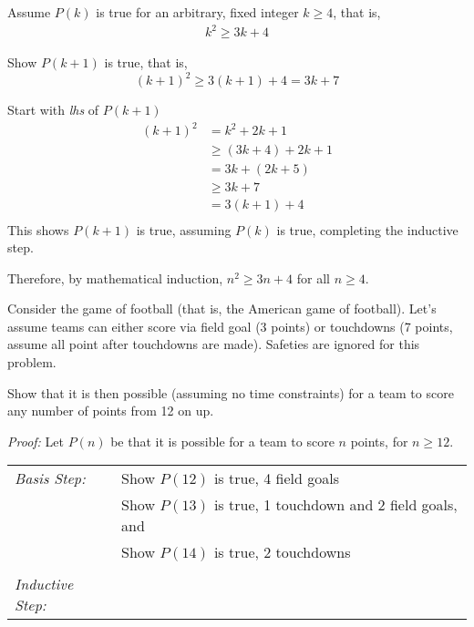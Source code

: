 \begin{questions}
\begin{solution}
  Assume $P(k)$ is true for an arbitrary, fixed integer $k \geq 4$, that is, 
  \begin{align*}
    k^2 \geq 3k + 4 \tag{IH} 
  \end{align*}

  Show $P(k+1)$ is true, that is, 
  \[ (k+1)^2 \geq 3(k+1) + 4 = 3k + 7 \]

  Start with \textit{lhs} of $P(k+1)$
  \begin{align*}
    (k+1)^2 &= k^2 + 2k + 1 \\
     &\geq (3k + 4) + 2k + 1 \tag{IH} \\
     &= 3k + (2k + 5) \\
     &\geq 3k + 7 \tag{2k +5 $\geq 7$ or k $\geq$ 1, for all k $\geq$ 4} \\
     &= 3(k+1) + 4 \\
  \end{align*}
  This shows $P(k+1)$ is true, assuming $P(k)$ is true, completing the inductive step. 

  Therefore, by mathematical induction, $n^2 \geq 3n + 4$ for all $n \geq 4$.
\end{solution}


 Consider the game of football (that is, the American game of football).  Let's assume teams can either score via field goal (3 points) or touchdowns (7 points, assume all point after touchdowns are made).   Safeties are ignored for this problem.  

Show that it is then possible (assuming no time constraints) for a team to score any number of points from 12 on up. 
    \ifprintanswers
        \vspace{-10pt}
   \fi
\begin{solution}
    \textit{Proof:}
    Let $P(n)$ be that it is possible for a team to score $n$ points, for $n \geq 12$.
    
    \smallskip
    \begin{tabular}{lp{4in}}
      \textit{Basis Step:}  & Show $P(12)$ is true, 4 field goals \\
                            & Show $P(13)$ is true, 1 touchdown and 2 field goals, and \\
                            & Show $P(14)$ is true, 2 touchdowns \\
       & \\
     \textit{Inductive Step:} &  \\
    \end{tabular}


\end{solution}
\end{questions}
